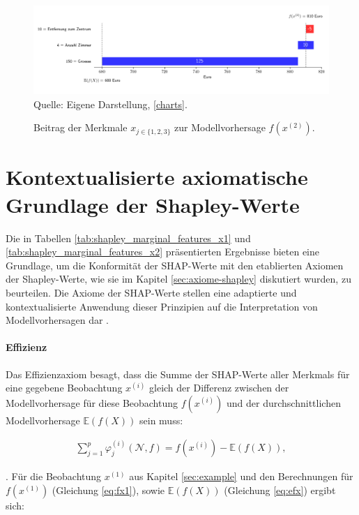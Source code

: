 \begin{figure}[!h]
    \caption{Beitrag der Merkmale $x_{j \in \{1, 2, 3\}}$ zur Modellvorhersage $f(x^{(2)})$.}
    \includegraphics[width=1\textwidth]{../scripts/images/model-output-x2.png}
    Quelle: Eigene Darstellung, \ref{charts}.
    \label{pic:model-fx2}
\end{figure}


\section{Kontextualisierte axiomatische Grundlage der Shapley-Werte}

Die in Tabellen \ref{tab:shapley_marginal_features_x1} und \ref{tab:shapley_marginal_features_x2} präsentierten Ergebnisse bieten eine Grundlage, 
um die Konformität der SHAP-Werte mit den etablierten Axiomen der Shapley-Werte, wie sie im 
Kapitel \ref{sec:axiome-shapley} diskutiert wurden, zu beurteilen. Die Axiome der SHAP-Werte stellen 
eine adaptierte und kontextualisierte Anwendung dieser Prinzipien auf die Interpretation von 
Modellvorhersagen dar \cite[S. 16f]{Algaba2019HandbookOT}.


\paragraph{Effizienz}

Das Effizienzaxiom besagt, dass die Summe der SHAP-Werte aller Merkmals für eine gegebene Beobachtung $x^{(i)}$ 
gleich der Differenz zwischen der Modellvorhersage für diese Beobachtung $f(x^{(i)})$ 
und der durchschnittlichen Modellvorhersage $\mathbb{E}(f(X))$ sein muss:

\begin{align}
    \sum_{j=1}^{p}\varphi_j^{(i)}(\mathcal{N}, f) = f(x^{(i)}) - \mathbb{E}(f(X)),
    \label{eq:eff}
\end{align}

\cite[S. 221]{Molnar_2022}. Für die Beobachtung $x^{(1)}$ aus Kapitel \ref{sec:example} und den Berechnungen 
für $f(x^{(1)})$ (Gleichung \ref{eq:fx1}), sowie $\mathbb{E}(f(X))$ (Gleichung \ref{eq:efx}) ergibt sich:

